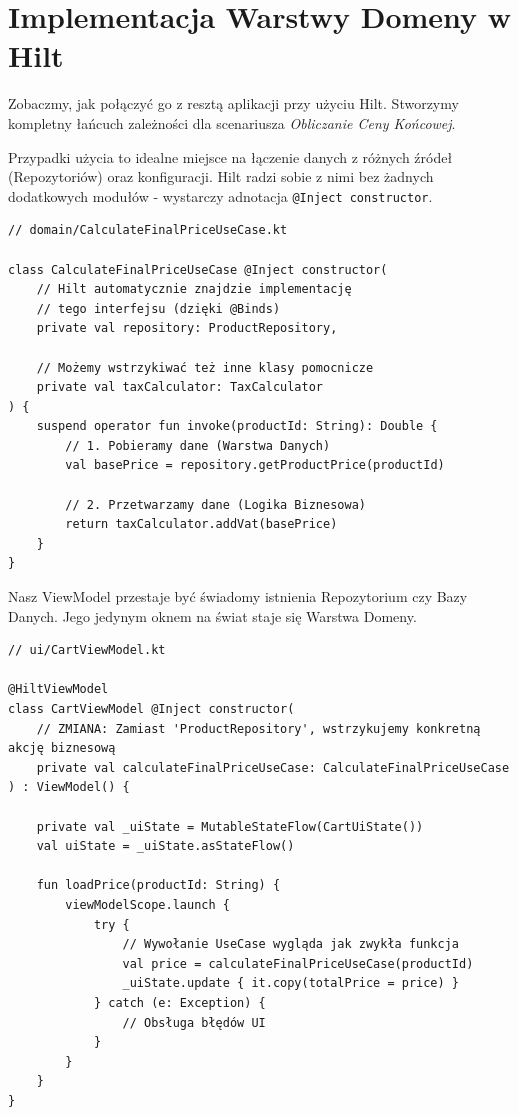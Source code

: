 \section{Implementacja Warstwy Domeny w Hilt}

Zobaczmy, jak połączyć go z resztą aplikacji przy użyciu Hilt. Stworzymy kompletny łańcuch zależności dla scenariusza \textit{Obliczanie Ceny Końcowej}.

Przypadki użycia to idealne miejsce na łączenie danych z różnych źródeł (Repozytoriów) oraz konfiguracji. Hilt radzi sobie z nimi bez żadnych dodatkowych modułów - wystarczy adnotacja \texttt{@Inject constructor}.

\begin{verbatim}
// domain/CalculateFinalPriceUseCase.kt

class CalculateFinalPriceUseCase @Inject constructor(
    // Hilt automatycznie znajdzie implementację 
    // tego interfejsu (dzięki @Binds)
    private val repository: ProductRepository,
    
    // Możemy wstrzykiwać też inne klasy pomocnicze
    private val taxCalculator: TaxCalculator
) {
    suspend operator fun invoke(productId: String): Double {
        // 1. Pobieramy dane (Warstwa Danych)
        val basePrice = repository.getProductPrice(productId)
        
        // 2. Przetwarzamy dane (Logika Biznesowa)
        return taxCalculator.addVat(basePrice)
    }
}
\end{verbatim}

Nasz ViewModel przestaje być świadomy istnienia Repozytorium czy Bazy Danych. Jego jedynym oknem na świat staje się Warstwa Domeny.

\begin{verbatim}
// ui/CartViewModel.kt

@HiltViewModel
class CartViewModel @Inject constructor(
    // ZMIANA: Zamiast 'ProductRepository', wstrzykujemy konkretną akcję biznesową
    private val calculateFinalPriceUseCase: CalculateFinalPriceUseCase
) : ViewModel() {

    private val _uiState = MutableStateFlow(CartUiState())
    val uiState = _uiState.asStateFlow()

    fun loadPrice(productId: String) {
        viewModelScope.launch {
            try {
                // Wywołanie UseCase wygląda jak zwykła funkcja
                val price = calculateFinalPriceUseCase(productId)
                _uiState.update { it.copy(totalPrice = price) }
            } catch (e: Exception) {
                // Obsługa błędów UI
            }
        }
    }
}
\end{verbatim}

